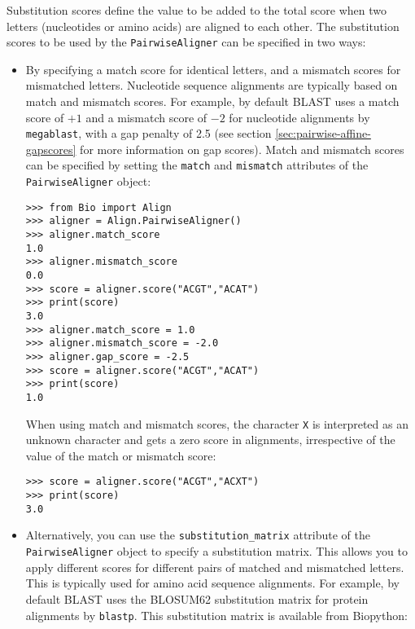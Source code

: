 Substitution scores define the value to be added to the total score when two letters (nucleotides or amino acids) are aligned to each other. The substitution scores to be used by the \verb+PairwiseAligner+ can be specified in two ways:

\begin{itemize}
\item By specifying a match score for identical letters, and a mismatch scores for mismatched letters. Nucleotide sequence alignments are typically based on match and mismatch scores. For example, by default BLAST \cite{altschul1990} uses a match score of $+1$ and a mismatch score of $-2$ for nucleotide alignments by \verb+megablast+, with a gap penalty of 2.5 (see section \ref{sec:pairwise-affine-gapscores} for more information on gap scores). Match and mismatch scores can be specified by setting the \verb+match+ and \verb+mismatch+ attributes of the \verb+PairwiseAligner+ object:

\begin{verbatim}
>>> from Bio import Align
>>> aligner = Align.PairwiseAligner()
>>> aligner.match_score
1.0
>>> aligner.mismatch_score
0.0
>>> score = aligner.score("ACGT","ACAT")
>>> print(score)
3.0
>>> aligner.match_score = 1.0
>>> aligner.mismatch_score = -2.0
>>> aligner.gap_score = -2.5
>>> score = aligner.score("ACGT","ACAT")
>>> print(score)
1.0
\end{verbatim}
When using match and mismatch scores, the character \verb+X+ is interpreted as an unknown character and gets a zero score in alignments, irrespective of the value of the match or mismatch score:
\begin{verbatim}
>>> score = aligner.score("ACGT","ACXT")
>>> print(score)
3.0
\end{verbatim}
\item
Alternatively, you can use the \verb+substitution_matrix+ attribute of the \verb+PairwiseAligner+ object to specify a substitution matrix. This allows you to apply different scores for different pairs of matched and mismatched letters. This is typically used for amino acid sequence alignments. For example, by default BLAST \cite{altschul1990} uses the BLOSUM62 substitution matrix for protein alignments by \verb+blastp+. This substitution matrix is available from Biopython:


\end{itemize}
